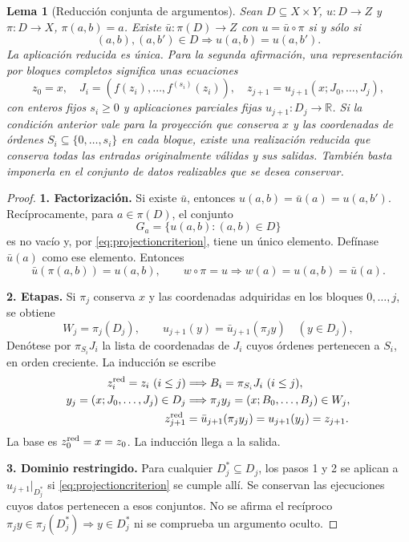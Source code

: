 \documentclass[11pt,a4paper]{article}
\numberwithin{equation}{section}
\newtheorem{lemma}[theorem]{Lema}
\theoremstyle{definition}
\theoremstyle{remark}
\newcommand{\R}{\mathbb R}
\newcommand{\paso}[1]{\par\smallskip\noindent\textbf{#1}\quad}
\begin{document}
\begin{lemma}[Reducción conjunta de argumentos]\label{lem:projection}\label{lem:sparse}
Sean $D\subseteq X\times Y$, $u:D\to Z$ y $\pi:D\to X$, $\pi(a,b)=a$. Existe $\bar u:\pi(D)\to Z$ con $u=\bar u\circ\pi$ si y sólo si
\begin{equation}\label{eq:projectioncriterion}
(a,b),(a,b')\in D\Longrightarrow u(a,b)=u(a,b').
\end{equation}
La aplicación reducida es única. Para la segunda afirmación, una representación por bloques completos significa unas ecuaciones
\[
z_0=x,\quad J_i=(f(z_i),\ldots,f^{(s_i)}(z_i)),\quad
z_{j+1}=u_{j+1}(x;J_0,\ldots,J_j),
\]
con enteros fijos $s_i\ge0$ y aplicaciones parciales fijas $u_{j+1}:D_j\to\R$. Si la condición anterior vale para la proyección que conserva $x$ y las coordenadas de órdenes $S_i\subseteq\{0,\ldots,s_i\}$ en cada bloque, existe una realización reducida que conserva todas las entradas originalmente válidas y sus salidas. También basta imponerla en el conjunto de datos realizables que se desea conservar.
\end{lemma}
\begin{proof}
\paso{1. Factorización.}
Si existe $\bar u$, entonces $u(a,b)=\bar u(a)=u(a,b')$. Recíprocamente, para $a\in\pi(D)$, el conjunto
\[
G_a=\{u(a,b):(a,b)\in D\}
\]
es no vacío y, por \eqref{eq:projectioncriterion}, tiene un único elemento. Defínase $\bar u(a)$ como ese elemento. Entonces
\[
\bar u(\pi(a,b))=u(a,b),\qquad
w\circ\pi=u\Longrightarrow w(a)=u(a,b)=\bar u(a).
\]
\paso{2. Etapas.}
Si $\pi_j$ conserva $x$ y las coordenadas adquiridas en los bloques $0,\ldots,j$, se obtiene
\[
W_j=\pi_j(D_j),\qquad
u_{j+1}(y)=\bar u_{j+1}(\pi_jy)\quad(y\in D_j),
\]
Denótese por $\pi_{S_i}J_i$ la lista de coordenadas de $J_i$ cuyos órdenes pertenecen a $S_i$, en orden creciente. La inducción se escribe
\begin{align*}
z_i^{\rm red}=z_i\ (i\le j)
&\Longrightarrow B_i=\pi_{S_i}J_i\ (i\le j),\\
y_j=(x;J_0,\ldots,J_j)\in D_j
&\Longrightarrow\pi_jy_j=(x;B_0,\ldots,B_j)\in W_j,\\
z_{j+1}^{\rm red}
&=\bar u_{j+1}(\pi_jy_j)=u_{j+1}(y_j)=z_{j+1}.
\end{align*}
La base es $z_0^{\rm red}=x=z_0$. La inducción llega a la salida.
\paso{3. Dominio restringido.}
Para cualquier $D_j^*\subseteq D_j$, los pasos 1 y 2 se aplican a $u_{j+1}|_{D_j^*}$ si \eqref{eq:projectioncriterion} se cumple allí. Se conservan las ejecuciones cuyos datos pertenecen a esos conjuntos. No se afirma el recíproco $\pi_jy\in\pi_j(D_j^*)\Rightarrow y\in D_j^*$ ni se comprueba un argumento oculto.
\end{proof}
\end{document}
